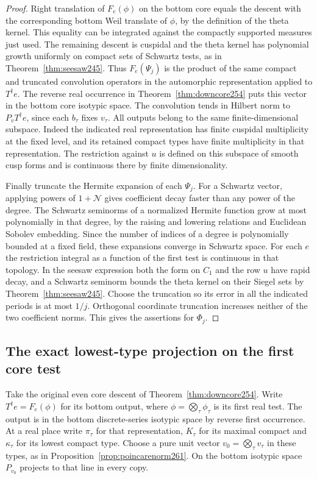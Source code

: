 \documentclass[a4paper,11pt]{article}
\theoremstyle{definition}
\theoremstyle{remark}
\numberwithin{equation}{section}
\begin{document}
\begin{proof}
Right translation of \(F_e(\phi)\) on the bottom core equals
the descent with the corresponding bottom Weil translate of
\(\phi\), by the definition of the theta kernel. This equality
can be integrated against the compactly supported measures just
used. The remaining descent is cuspidal and the theta kernel
has polynomial growth uniformly on compact sets of Schwartz
tests, as in Theorem~\ref{thm:seesaw245}. Thus \(F_e(\Psi_j)\)
is the product of the same compact and truncated convolution
operators in the automorphic representation applied to
\(T^\dagger e\). The reverse real occurrence in
Theorem~\ref{thm:downcore254} puts this vector in the bottom
core isotypic space. The convolution tends in Hilbert norm to
\(P_vT^\dagger e\), since each \(b_\tau\) fixes \(v_\tau\).
All outputs belong to the same finite-dimensional subspace.
Indeed the indicated real representation has finite cuspidal
multiplicity at the fixed level, and its retained compact types
have finite multiplicity in that representation. The
restriction against \(u\) is defined on this subspace of smooth
cusp forms and is continuous there by finite dimensionality.

Finally truncate the Hermite expansion of each \(\Psi_j\).
For a Schwartz vector, applying powers of \(1+\mathcal N\)
gives coefficient decay faster than any power of the degree.
The Schwartz seminorms of a normalized Hermite function grow
at most polynomially in that degree, by the raising and lowering
relations and Euclidean Sobolev embedding. Since the number
of indices of a degree is polynomially bounded at a fixed field,
these expansions converge in Schwartz space. For each \(e\)
the restriction integral as a function of the first test is
continuous in that topology. In the seesaw expression both
the form on \(C_1\) and the row \(u\) have rapid decay, and a
Schwartz seminorm bounds the theta kernel on their Siegel sets
by Theorem~\ref{thm:seesaw245}. Choose the truncation so its
error in all the indicated periods is at most \(1/j\). Orthogonal
coordinate truncation increases neither of the two coefficient
norms. This gives the assertions for \(\Phi_j\).
\end{proof}

\subsection{The exact lowest-type projection on the first core test}\label{nav:III-49}
Take the original even core descent of
Theorem~\ref{thm:downcore254}. Write \(T^\dagger e=F_e(\phi)\)
for its bottom output, where \(\phi=\bigotimes_\tau\phi_\tau\)
is its first real test. The output is in the bottom
discrete-series isotypic space by reverse first occurrence.
At a real place write \(\pi_\tau\) for that representation,
\(K_\tau\) for its maximal compact and \(\kappa_\tau\) for
its lowest compact type. Choose a pure unit vector
\(v_0=\bigotimes_\tau v_\tau\) in these types, as in
Proposition~\ref{prop:poincarenorm261}. On the bottom isotypic
space \(P_{v_0}\) projects to that line in every copy.
\end{document}
